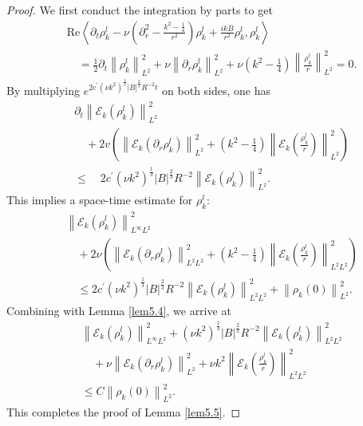 \documentclass[final, 12pt,reqno]{amsart}
\numberwithin{equation}{section}
\begin{document}
\begin{proof}
     We first conduct the integration by parts to get
$$
\begin{aligned}
    & \text{Re}\left\langle\partial_t \rho_k^l-\nu\left(\partial_r^2-\frac{k^2-\frac{1}{4}}{r^2}\right) \rho_k^l+\frac{i k B}{r^2} \rho_k^l, \rho_k^l\right\rangle \\
    & \quad=\frac{1}{2} \partial_t\left\|\rho_k^l\right\|_{L^2}^2+\nu\left\|\partial_r \rho_k^l\right\|_{L^2}^2+\nu\left(k^2-\frac{1}{4}\right)\left\|\frac{\rho_k^l}{r}\right\|_{L^2}^2=0 .
\end{aligned}
$$
By multiplying $e^{2 c^{\prime}\left(\nu
k^2\right)^{\frac{1}{3}}|B|^{\frac{2}{3}} R^{-2} t}$ on both sides,
one has
$$
\begin{aligned}
    & \partial_t\left\|\mathcal{E}_k (\rho_k^l)\right\|_{L^2}^2 \\
    & \quad+2 v\left(\left\|\mathcal{E}_k (\partial_r \rho_k^l)\right\|_{L^2}^2+\left(k^2-\frac{1}{4}\right)\left\|\mathcal{E}_k (\frac{\rho_k^l}{r})\right\|_{L^2}^2\right) \\
    & \leq
     \quad 2 c^{\prime}\left(\nu k^2\right)^{\frac{1}{3}}|B|^{\frac{2}{3}} R^{-2}\left\|\mathcal{E}_k (\rho_k^l)\right\|_{L^2}^2 .
\end{aligned}
$$
This implies a space-time estimate for $\rho_k^l$:
$$
\begin{aligned}
    & \left\|\mathcal{E}_k (\rho_k^l)\right\|_{L^{\infty} L^2}^2 \\
    & \quad+2 \nu\left(\left\|\mathcal{E}_k (\partial_r \rho_k^l)\right\|_{L^2 L^2}^2+\left(k^2-\frac{1}{4}\right)\left\|\mathcal{E}_k (\frac{\rho_k^l}{r})\right\|_{L^2 L^2}^2\right) \\
    & \quad \leq
    2 c^{\prime}\left(\nu k^2\right)^{\frac{1}{3}}|B|^{\frac{2}{3}} R^{-2}\left\|\mathcal{E}_k (\rho_k^l)\right\|_{L^2 L^2}^2+\left\|\rho_k(0)\right\|_{L^2}^2 .
\end{aligned}
$$
Combining with Lemma \ref{lem5.4}, we arrive at
$$
\begin{aligned}
    &   \left\|\mathcal{E}_k(\rho_k^l)\right\|_{L^\infty L^2}^2 +\left(\nu k^2\right)^{\frac{1}{3}}|B|^{\frac{2}{3}} R^{-2}\left\|\mathcal{E}_k (\rho_k^l)\right\|_{L^2 L^2}^2\\
    &\quad+ \nu\left\|\mathcal{E}_k(\partial_{r}\rho_k^l)\right\|_{L^2}^2 +\nu k^2\left\|\mathcal{E}_k(\frac{\rho_k^l}{r})\right\|_{L^2L^2}^2\\
    &\leq C\left\|\rho_k(0)\right\|_{L^2}^2.
\end{aligned}
$$
This completes the proof of Lemma \ref{lem5.5}.
\end{proof}
\end{document}
